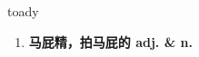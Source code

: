 
\begin{frame}
{\huge toady}
\begin{center}
\begin{enumerate}\Large
  \item \textbf{马屁精，拍马屁的 adj. \& n.}
\end{enumerate}
\end{center}
\end{frame}
